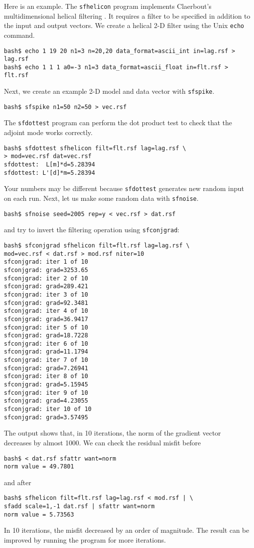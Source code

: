 Here is an example. The \texttt{sfhelicon}
program implements Claerbout's multidimensional helical filtering
\cite[]{GEO63-05-15321541}. It requires a filter to be specified in
addition to the input and output vectors. We create a helical 
2-D filter using the Unix \texttt{echo} command.
\begin{verbatim}
bash$ echo 1 19 20 n1=3 n=20,20 data_format=ascii_int in=lag.rsf > lag.rsf
bash$ echo 1 1 1 a0=-3 n1=3 data_format=ascii_float in=flt.rsf > flt.rsf
\end{verbatim}
Next, we create an example 2-D model and data vector with \texttt{sfspike}.
\begin{verbatim}
bash$ sfspike n1=50 n2=50 > vec.rsf
\end{verbatim}
The \texttt{sfdottest} program can perform the dot product test to
check that the adjoint mode works correctly.
\begin{verbatim}
bash$ sfdottest sfhelicon filt=flt.rsf lag=lag.rsf \
> mod=vec.rsf dat=vec.rsf
sfdottest:  L[m]*d=5.28394
sfdottest: L'[d]*m=5.28394
\end{verbatim}
Your numbers may be different because \texttt{sfdottest} generates new
random input on each run.
Next, let us make some random data with \texttt{sfnoise}.
\begin{verbatim}
bash$ sfnoise seed=2005 rep=y < vec.rsf > dat.rsf
\end{verbatim}
and try to invert the filtering operation using \texttt{sfconjgrad}:
\begin{verbatim}
bash$ sfconjgrad sfhelicon filt=flt.rsf lag=lag.rsf \
mod=vec.rsf < dat.rsf > mod.rsf niter=10
sfconjgrad: iter 1 of 10
sfconjgrad: grad=3253.65
sfconjgrad: iter 2 of 10
sfconjgrad: grad=289.421
sfconjgrad: iter 3 of 10
sfconjgrad: grad=92.3481
sfconjgrad: iter 4 of 10
sfconjgrad: grad=36.9417
sfconjgrad: iter 5 of 10
sfconjgrad: grad=18.7228
sfconjgrad: iter 6 of 10
sfconjgrad: grad=11.1794
sfconjgrad: iter 7 of 10
sfconjgrad: grad=7.26941
sfconjgrad: iter 8 of 10
sfconjgrad: grad=5.15945
sfconjgrad: iter 9 of 10
sfconjgrad: grad=4.23055
sfconjgrad: iter 10 of 10
sfconjgrad: grad=3.57495
\end{verbatim}
The output shows that, in 10 iterations, the norm of the gradient vector decreases by almost 1000. 
We can check the residual misfit before
\begin{verbatim}
bash$ < dat.rsf sfattr want=norm
norm value = 49.7801
\end{verbatim}
and after
\begin{verbatim}
bash$ sfhelicon filt=flt.rsf lag=lag.rsf < mod.rsf | \
sfadd scale=1,-1 dat.rsf | sfattr want=norm
norm value = 5.73563
\end{verbatim}
In 10 iterations, the misfit decreased by an order of magnitude. The
result can be improved by running the program for more iterations.

